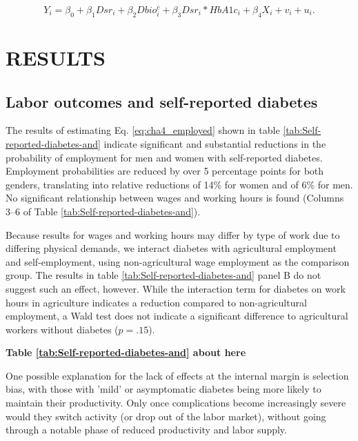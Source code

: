 \documentclass[12pt,english]{article}
\begin{document}
\begin{equation}
Y_{i}=\beta_{0}+\beta_{1}Dsr_{i}+\beta_{2}Dbio^{c}_{i}+\beta_{3}Dsr_{i}*HbA1c_{i}+\beta_{4}X_{i}+v_{i}+u_{i}.\label{eq:diab_hba1c}
\end{equation}

\section{\label{sec:cha_4_results}RESULTS}


\subsection{Labor outcomes and self-reported diabetes}

The results of estimating Eq. \ref{eq:cha4_employed} shown in table \ref{tab:Self-reported-diabetes-and} indicate significant and substantial reductions in the probability of employment for men and women with self-reported diabetes. Employment probabilities are reduced by over 5 percentage points for both genders, translating into relative reductions of 14\% for women and of 6\% for men. No significant relationship between wages and working hours is found (Columns 3--6 of Table \ref{tab:Self-reported-diabetes-and}).

Because results for wages and working hours may differ by type of work due to differing physical demands, we interact diabetes with agricultural employment and self-employment, using non-agricultural wage employment as the comparison group. The results in table \ref{tab:Self-reported-diabetes-and} panel B do not suggest such an effect, however. While the interaction term for diabetes on work hours in agriculture indicates a reduction compared to non-agricultural employment, a Wald test does not indicate a significant difference to agricultural workers without diabetes  ($p = .15$).

\begin{center}
	\textbf{Table \ref{tab:Self-reported-diabetes-and} about here}
\end{center}

One possible explanation for the lack of effects at the internal margin is selection bias, with those with 'mild' or asymptomatic diabetes being more likely to maintain their productivity. Only once complications become increasingly severe would they switch activity (or drop out of the labor market), without going through a notable phase of reduced productivity and labor supply.
\end{document}
